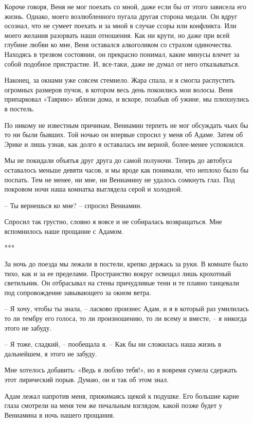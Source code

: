 \documentclass[
]{book}
\begin{document}
Короче говоря, Веня не мог поехать со мной, даже если бы от этого зависела его жизнь. Однако, моего возлюбленного пугала другая сторона медали. Он вдруг осознал, что не сумеет поехать и за мной в случае ссоры или конфликта. Или моего желания разорвать наши отношения. Как ни крути, но даже при всей глубине любви ко мне, Веня оставался алкоголиком со страхом одиночества. Находясь в трезвом состоянии, он прекрасно понимал, какие минусы влечет за собой подобное пристрастие. И, все-таки, даже не думал от него отказываться.

Наконец, за окнами уже совсем стемнело. Жара спала, и я смогла распустить огромных размеров пучок, в котором весь день покоились мои волосы. Веня припарковал «Таврию» вблизи дома, и вскоре, позабыв об ужине, мы плюхнулись в постель.

По никому не известным причинам, Вениамин терпеть не мог обсуждать чьих бы то ни были бывших. Той ночью он впервые спросил у меня об Адаме. Затем об Эрике и лишь узнав, как долго я оставалась им верной, более-менее успокоился.

Мы не покидали объятья друг друга до самой полуночи. Теперь до автобуса оставалось меньше девяти часов, и мы вроде как понимали, что неплохо было бы поспать. Тем не менее, ни мне, ни Вениамину не удалось сомкнуть глаз. Под покровом ночи наша комнатка выглядела серой и холодной.

-- Ты вернешься ко мне? -- спросил Вениамин.

Спросил так грустно, словно я вовсе и не собиралась возвращаться. Мне вспомнилось наше прощание с Адамом.

***

За ночь до поезда мы лежали в постели, крепко держась за руки. В комнате было тихо, как и за ее пределами. Пространство вокруг освещал лишь крохотный светильник. Он отбрасывал на стены причудливые тени и те плавно танцевали под сопровождение завывающего за окном ветра.

-- Я хочу, чтобы ты знала, -- ласково произнес Адам, и я в который раз умилилась то ли тембру его голоса, то ли произношению, то ли всему и вместе, -- я никогда этого не забуду.

-- Я тоже, сладкий, -- пообещала я. -- Как бы ни сложилась наша жизнь в дальнейшем, я этого не забуду.

Мне хотелось добавить: «Ведь я люблю тебя!», но я вовремя сумела сдержать этот лирический порыв. Думаю, он и так об этом знал.

Адам лежал напротив меня, прижимаясь щекой к подушке. Его большие карие глаза смотрели на меня тем же печальным взглядом, какой позже будет у Вениамина в ночь нашего прощания.
\end{document}
